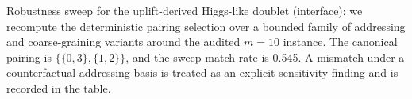 \noindent Robustness sweep for the uplift-derived Higgs-like doublet (interface): we recompute the deterministic pairing selection over a bounded family of addressing and coarse-graining variants around the audited $m=10$ instance. The canonical pairing is $\{\{0,3\},\{1,2\}\}$, and the sweep match rate is 0.545. A mismatch under a counterfactual addressing basis is treated as an explicit sensitivity finding and is recorded in the table.